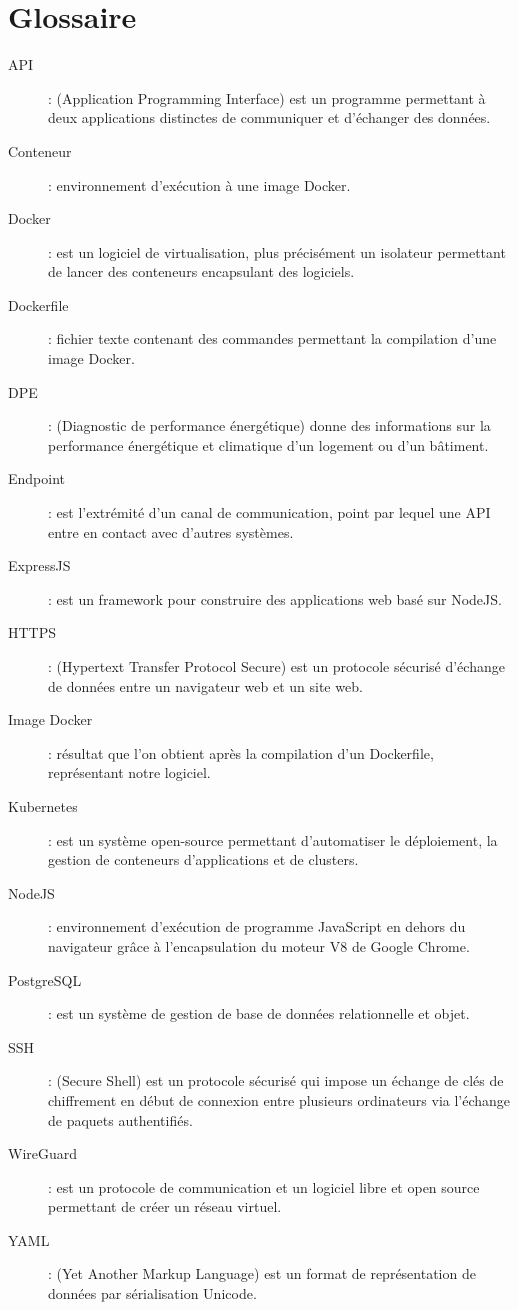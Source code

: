 \chapter*{Glossaire}
\begin{description}
    \item[API] : (Application Programming Interface) est un programme permettant \`a deux applications distinctes de communiquer et d'\'echanger des donn\'ees.
    \item[Conteneur] : environnement d'ex\'ecution \`a une image Docker.
    \item[Docker] : est un logiciel de virtualisation, plus pr\'ecis\'ement un isolateur permettant de lancer des conteneurs encapsulant des logiciels.
    \item[Dockerfile] : fichier texte contenant des commandes permettant la compilation d'une image Docker.
    \item[DPE] : (Diagnostic de performance \'energ\'etique) donne des informations sur la performance \'energ\'etique et climatique d'un logement ou d'un b\^atiment.
    \item[Endpoint] : est l'extr\'emit\'e d'un canal de communication, point par lequel une API entre en contact avec d'autres syst\`emes.
    \item[ExpressJS] : est un framework pour construire des applications web bas\'e sur NodeJS.
    \item[HTTPS] : (Hypertext Transfer Protocol Secure) est un protocole s\'ecuris\'e d'\'echange de
donn\'ees entre un navigateur web et un site web.
    \item[Image Docker] : r\'esultat que l'on obtient apr\`es la compilation d'un Dockerfile, repr\'esentant notre logiciel.
    \item[Kubernetes] : est un syst\`eme open-source permettant d'automatiser le d\'eploiement, la
gestion de conteneurs d'applications et de clusters.
    \item[NodeJS] : environnement d'ex\'ecution de programme JavaScript en dehors du navigateur
gr\^ace \`a l'encapsulation du moteur V8 de Google Chrome.
    \item[PostgreSQL] : est un syst\`eme de gestion de base de donn\'ees relationnelle et objet.
    \item[SSH] : (Secure Shell) est un protocole s\'ecuris\'e qui impose un \'echange de cl\'es de chiffrement en d\'ebut de connexion entre plusieurs ordinateurs via l'\'echange de paquets authentifi\'es.
    \item[WireGuard] : est un protocole de communication et un logiciel libre et open source permettant de cr\'eer un r\'eseau virtuel.
    \item[YAML] : (Yet Another Markup Language) est un format de repr\'esentation de donn\'ees par
s\'erialisation Unicode.
\end{description}

